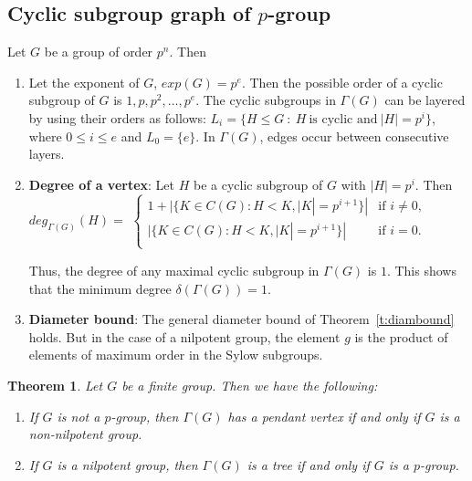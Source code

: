 \documentclass[11pt,twoside]{amsart}
\newtheorem{theorem}{Theorem}[section]
\begin{document}
\subsection{Cyclic subgroup graph of $p$-group}

Let $G$ be a group of order $p^n$. Then
\begin{enumerate}
    \item Let the exponent of $G$, $exp (G)=p^e$. Then the possible order of a cyclic subgroup of $G$ is $1,p,p^2,\dots, p^e$. The cyclic subgroups in $\Gamma (G)$ can be layered by using their orders as follows: $L_i=\{H\leq G~:~H~\text{is cyclic and}~|H|=p^i\}$, where $0\leq i\leq e$ and $L_0=\{e\}$. In $\Gamma (G)$, edges occur between consecutive layers. 
    \item \textbf{Degree of a vertex}: Let $H$ be a cyclic subgroup of $G$ with $|H|=p^i$. Then\\ $deg_{\Gamma (G)}(H)=$
    $\begin{cases}
            1+|\{K\in C(G):H<K,|K|=p^{i+1}\}| & \mbox{if $i\not =0$},\\
            |\{K\in C(G):H<K,|K|=p^{i+1}\}|  & \mbox{if $i=0$.}\\
              \end{cases}$ 

    Thus, the degree of any maximal cyclic subgroup in $\Gamma (G)$ is $1$. This shows that the minimum degree $\delta (\Gamma (G))=1$.
    \item \textbf{Diameter bound}: The general diameter bound of
Theorem~\ref{t:diambound} holds. But in the case of a nilpotent group, the
element $g$ is the product of elements of maximum order in the Sylow subgroups.
\end{enumerate}

\begin{theorem}\label{thmtree}
Let $G$ be a finite group. Then we have the following:
\begin{enumerate}[label={(\arabic*)}]
\item\label{thm:nil:part1} If $G$ is not a $p$-group, then $\Gamma (G)$ has a pendant vertex if and only if $G$ is a non-nilpotent group.
\item\label{thm:nil:part2} If $G$ is a nilpotent group, then $\Gamma (G)$ is a tree if and only if $G$ is a $p$-group.
\end{enumerate}
\end{theorem}
\end{document}
